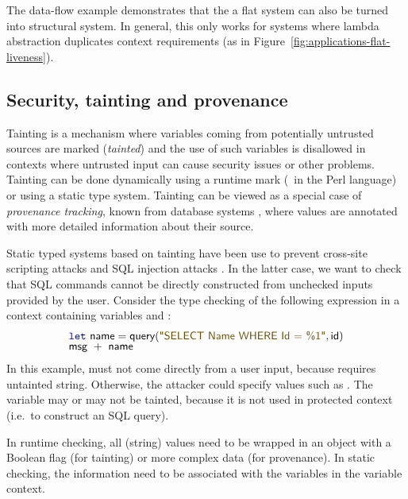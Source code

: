 The data-flow example demonstrates that the a flat system can also be turned into structural
system. In general, this only works for systems where lambda abstraction duplicates context
requirements (as in Figure~\ref{fig:applications-flat-liveness}).


\subsection{Security, tainting and provenance}
Tainting is a mechanism where variables coming from potentially untrusted sources are marked
(\emph{tainted}) and the use of such variables is disallowed in contexts where untrusted input
can cause security issues or other problems. Tainting can be done dynamically using a runtime mark
(\eg~in the Perl language) or using a static type system. Tainting can be viewed as a special
case of \emph{provenance tracking}, known from database systems \cite{app-provenance-db}, where
values are annotated with more detailed information about their source.

Static typed systems based on tainting have been use to prevent cross-site scripting attacks
\cite{app-tainting-xss} and SQL injection attacks \cite{app-tainting-sql,app-tainting-wasp}.
In the latter case, we want to check that SQL commands cannot be directly constructed from
unchecked inputs provided by the user. Consider the type checking of the following
expression in a context containing variables  and :
%
\begin{equation*}
\begin{array}{l}
\kvd{let}~\ident{name} = \ident{query}(\str{SELECT Name WHERE Id = \%1}, \ident{id})\\[-0.25em]
\ident{msg}~+~\ident{name}
\end{array}
\end{equation*}
%
In this example,  must not come directly from a user input, because  requires
untainted string. Otherwise, the attacker could specify values such as .
The variable  may or may not be tainted, because it is not used in protected context
(i.e.~to construct an SQL query).

In runtime checking, all (string) values need to be wrapped in an object with a Boolean
flag (for tainting) or more complex data (for provenance). In static checking, the information
need to be associated with the variables in the variable context.

